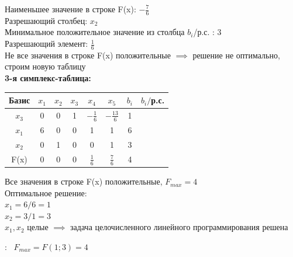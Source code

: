 \begin{flushleft}
    Наименьшее значение в строке F(x): $-\frac{7}{6}$\\
    Разрешающий столбец: $x_2$\\
    Минимальное положительное значение из столбца $b_i$/р.с. : 3\\
    Разрешающий элемент: $\frac{1}{6}$\\
    Не все значения в строке F(x) положительные $\implies$ решение не оптимально, строим новую таблицу\\
    {\bf3-я симплекс-таблица:}\\
\end{flushleft}

\begin{center}
    \begin{tabular}{|c | c c c c c c c|} 
         \hline
            Базис & $x_1$ & $x_2$ & $x_3$ & $x_4$ & $x_5$ & $b_i$ & $b_i/$р.с.\\
         \hline
            $x_3$ & 0 & 0 & 1 & $-\frac{1}{6}$ & $-\frac{13}{6}$ & 1 & \\
         \hline
            $x_1$ & 6 & 0 & 0 & 1 & 1 & 6 & \\
         \hline
            $x_2$ & 0 & 1 & 0 & 0 & 1 & 3 & \\
         \hline
            F(x) & 0 & 0 & 0 & $\frac{1}{6}$ & $\frac{7}{6}$ & 4 &\\
         \hline
    \end{tabular}
\end{center}

\begin{flushleft}
    Все значения в строке F(x) положительные, $F_{max} = 4$\\
    Оптимальное решение:\\
    $x_1 = 6/6 = 1$\\
    $x_2 = 3/1 = 3$\\
    $x_1, x_2$ целые $\implies$ задача целочисленного линейного программирования решена
\end{flushleft}

{:~} $F_{max} = F(1; 3) = 4$
